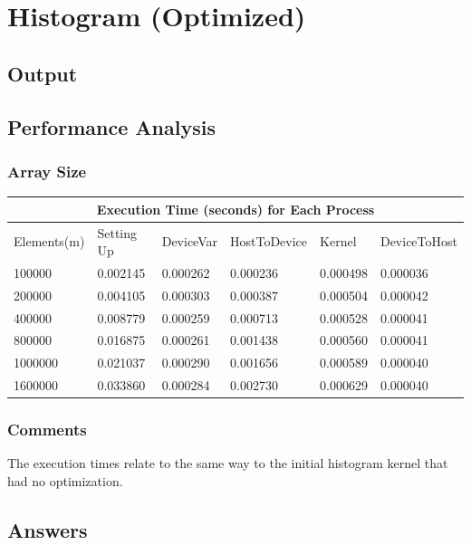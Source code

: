 \documentclass{article}
\begin{document}
\section{Histogram (Optimized)}
\subsection{Output}

\subsection{Performance Analysis}
 \subsubsection{Array Size} 
 \setlength{\parindent}{1cm}
 \begin{tabular}{ |p{2.5cm}||p{2cm}|p{2cm}|p{2cm}|p{2cm}|p{2cm}|  }
 \hline
 \multicolumn{6}{|c|}{Execution Time (seconds) for Each Process } \\
 \hline
Elements(m) & Setting Up & DeviceVar & HostToDevice & Kernel & DeviceToHost\\
 \hline
 100000 & 0.002145 & 0.000262 & 0.000236 & 0.000498 & 0.000036\\
 \hline
 200000 & 0.004105 & 0.000303 & 0.000387 & 0.000504 & 0.000042\\
 \hline
 400000 & 0.008779 & 0.000259 & 0.000713 & 0.000528 & 0.000041\\
 \hline
 800000 & 0.016875 & 0.000261 & 0.001438 & 0.000560 & 0.000041\\
 \hline
 1000000 & 0.021037 & 0.000290 & 0.001656 & 0.000589 & 0.000040\\
 \hline
 1600000 & 0.033860 & 0.000284 & 0.002730 & 0.000629 & 0.000040\\
 \hline
 \end{tabular}

\subsubsection{Comments} 
 The execution times relate to the same way to the initial histogram kernel that had no optimization. 

\subsection{Answers}
\end{document}
